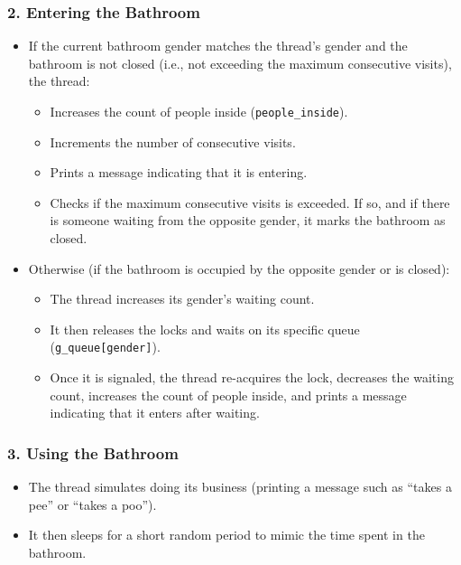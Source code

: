 \documentclass[a4paper,11pt]{article}
\begin{document}
\subsubsection*{2. Entering the Bathroom}
\begin{itemize}[noitemsep]
    \item If the current bathroom gender matches the thread's gender and the bathroom is not closed (i.e., not exceeding the maximum consecutive visits), the thread:
    \begin{itemize}[noitemsep]
        \item Increases the count of people inside (\texttt{people\_inside}).
        \item Increments the number of consecutive visits.
        \item Prints a message indicating that it is entering.
        \item Checks if the maximum consecutive visits is exceeded. If so, and if there is someone waiting from the opposite gender, it marks the bathroom as closed.
    \end{itemize}
    \item Otherwise (if the bathroom is occupied by the opposite gender or is closed):
    \begin{itemize}[noitemsep]
        \item The thread increases its gender’s waiting count.
        \item It then releases the locks and waits on its specific queue (\texttt{g\_queue[gender]}).
        \item Once it is signaled, the thread re-acquires the lock, decreases the waiting count, increases the count of people inside, and prints a message indicating that it enters after waiting.
    \end{itemize}
\end{itemize}

\subsubsection*{3. Using the Bathroom}
\begin{itemize}[noitemsep]
    \item The thread simulates doing its business (printing a message such as “takes a pee” or “takes a poo”).
    \item It then sleeps for a short random period to mimic the time spent in the bathroom.
\end{itemize}
\end{document}
